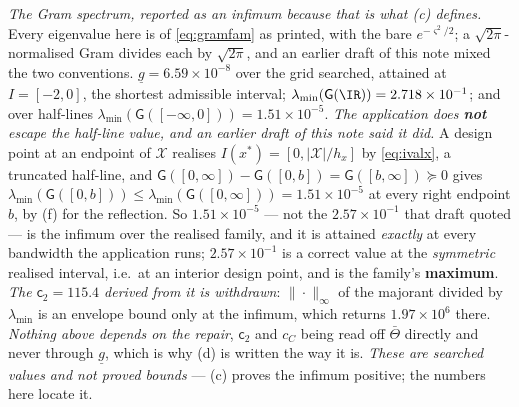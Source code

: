 \noindent\emph{The Gram spectrum, reported as an infimum because that is what \textup{(c)} defines.}
Every eigenvalue here is of \eqref{eq:gramfam} as printed, with the bare $e^{-\varsigma^{2}/2}$; a
$\sqrt{2\pi}$-normalised Gram divides each by $\sqrt{2\pi}$, and an earlier draft of this note mixed the
two conventions. $\underline g=6.59\times10^{-8}$ over the grid searched, attained at $I=[-2,0]$, the
shortest admissible interval; $\lambda_{\min}(\mathsf G(\IR))=2.718\times10^{-1}$; and over half-lines
$\lambda_{\min}(\mathsf G([-\infty,0]))=1.51\times10^{-5}$. \emph{The application does \textbf{not}
escape the half-line value, and an earlier draft of this note said it did.} A design point at an
endpoint of $\mathcal X$ realises $I(x^\ast)=[0,|\mathcal X|/h_x]$ by \eqref{eq:ivalx}, a truncated
half-line, and $\mathsf G([0,\infty])-\mathsf G([0,b])=\mathsf G([b,\infty])\succeq0$ gives
$\lambda_{\min}(\mathsf G([0,b]))\le\lambda_{\min}(\mathsf G([0,\infty]))=1.51\times10^{-5}$ at every
right endpoint $b$, by \textup{(f)} for the reflection. So $1.51\times10^{-5}$ --- not the $2.57\times10^{-1}$ that
draft quoted --- is the infimum over the realised family, and it is attained \emph{exactly} at every
bandwidth the application runs; $2.57\times10^{-1}$ is a correct value at the \emph{symmetric} realised
interval, i.e.\ at an interior design point, and is the family's \textbf{maximum}. \emph{The
$\mathsf c_2=115.4$ derived from it is withdrawn}: $\|\cdot\|_\infty$ of the majorant divided by
$\lambda_{\min}$ is an envelope bound only at the infimum, which returns $1.97\times10^{6}$ there.
\emph{Nothing above depends on the repair}, $\mathsf c_2$ and $c_C$ being read off $\bar\Theta$ directly
and never through $\underline g$, which is why \textup{(d)} is written the way it is. \emph{These are
searched values and not proved bounds} --- \textup{(c)} proves the infimum positive; the numbers here
locate it.
